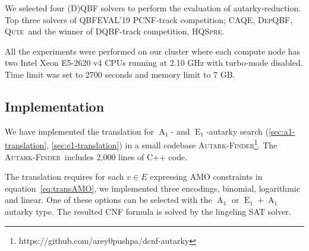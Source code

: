\documentclass[runningheads]{llncs}
\DeclareMathOperator{\Aaut}{A}
\DeclareMathOperator{\Eaut}{E}
\newcommand{\caqe}{\textsc{CAQE}}
\newcommand{\depqbf}{\textsc{DepQBF}}
\newcommand{\qute}{\textsc{Qute}}
\newcommand{\hqspre}{\textsc{HQSpre}}
\newcommand{\autfinder}{\textsc{Autark-Finder}}
\begin{document}

We selected four (D)QBF solvers to perform the evaluation of autarky-reduction. Top three solvers of QBFEVAL'19 PCNF-track competition; \caqe \cite{DBLP:conf/fmcad/RabeT15}, \depqbf \cite{DBLP:conf/cade/LonsingE17}, \qute \cite{DBLP:journals/jsat/PeitlSS19}\ and the winner of DQBF-track competition, \hqspre \cite{DBLP:conf/tacas/WimmerRM017}.

All the experiments were performed on our cluster where each compute node has
two Intel Xeon E5-2620 v4 CPUs running at 2.10 GHz with turbo-mode disabled.
Time limit was set to 2700 seconds and memory limit to 7 GB.

\subsection{Implementation}
We have implemented the translation for $\Aaut_1$- and $\Eaut_1$-autarky search  (\ref{sec:a1-translation}, \ref{sec:e1-translation}) in a small codebase \autfinder\footnote{https://github.com/arey0pushpa/dcnf-autarky}. The \autfinder\ includes 2,000 lines of C++ code.

The translation requires for each $v \in E$ expressing AMO constraints in equation~\ref{eq:transAMO}, we implemented three encodings, binomial, logarithmic and linear. One of these options can be selected with the $\Aaut_1$ or $\Eaut_1+\Aaut_1$ autarky type. The resulted CNF formula is solved by the lingeling \cite{Biere-SAT-Competition-2017-solvers} SAT solver.
\end{document}

